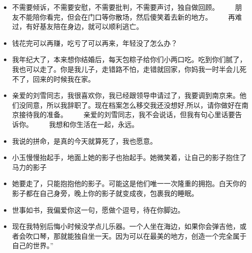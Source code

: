 \documentclass[UTF8,a4paper,8pt]{ctexbook}
\begin{document}
\begin{itemize}
					\item 不需要倾诉，不需要安慰，不需要批判，不需要声讨，独自做回顾。 　　朋友不能陪你看完，但会在门口等你散场，然后傻笑着去新的地方。 　　再难过，有好基友陪在身边，就可以顺利逃亡。
					\item 钱花完可以再赚，吃亏了可以再来，年轻没了怎么办？
					\item 我年纪大了，本来想你结婚后，每天包粽子给你们小两口吃。吃到你们腻了，我也可以走了。你是我儿子，走错路不怕，走错就回家，你妈我一时半会儿死不了，回来的时候我在家。
					\item 亲爱的刘雪同志，我很喜欢你，我已经跟领导申请过了，我要调到南京来。他们没同意，所以我辞职了。现在档案怎么移交我还没想好,所以，请你做好在南京接待我的准备。 　　亲爱的刘雪同志，我不会说话，但我有句心里话要告诉你。 　　我想和你生活在一起，永远。
					\item 我说的拼命，是真的今天就算死了，我也愿意。
					\item 小玉慢慢抬起手，地面上她的影子也抬起手。她微笑着，让自己的影子抱住了马力的影子
					\item 她要走了，只能抱抱他的影子。可能这是他们唯一一次隆重的拥抱。白天你的影子都在自己身旁，晚上你的影子就变成夜，包裹我的睡眠。
					\item 世事如书，我偏爱你这一句，愿做个逗号，待在你脚边。
					\item 现在我特别后悔小时候没学点儿乐器。一个人坐在海边，如果你会弹吉他，或者会吹口琴，那就能独自坐一天。因为可以在最美的地方，创造一个完全属于自己的世界。” 　　
					

\end{itemize}
\end{document}
